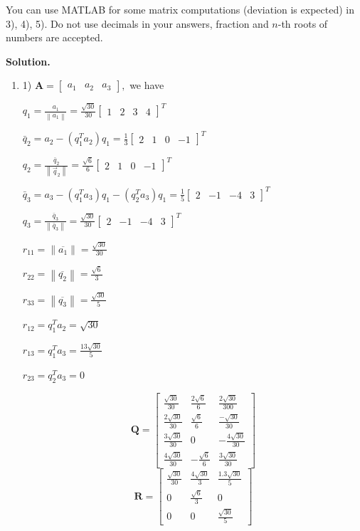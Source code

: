 \documentclass[english,onecolumn]{IEEEtran}
\begin{document}
 You can use MATLAB for some matrix computations (deviation is expected) in 3), 4), 5).
Do not use decimals in your answers, fraction and $n$-th roots of numbers are accepted.

\noindent
\textbf{Solution.}
\begin{enumerate}
	\item 1)  $\mathbf{A}=\left[\begin{array}{lll}a_{1} & a_{2} & a_{3}\end{array}\right],$ we have
	
	$q_{1}=\frac{a_{1}}{\left\|a_{1}\right\|}=\frac{\sqrt{30}}{30}
	\left[\begin{array}{llll}
		1 & 2 & 3 & 4
	\end{array}\right]^{T}$

$
\bar{q}_{2}=a_{2}-\left(q_{1}^{T} a_{2}\right) q_{1}=\frac{1}{3}
\left[\begin{array}{cccc}
	2 & 1 & 0 & -1
\end{array}\right]^{T} $

$ q_{2}=\frac{\bar{q}_{2}}{\left\|\vec{q}_{2}\right\|}=\frac{\sqrt{6}}{6}
\left[\begin{array}{cccc}
	2 & 1 & 0 & -1
\end{array}\right]^{T}
$

$\bar{q}_{3}=a_{3}-\left(q_{1}^{T} a_{3}\right) q_{1}-\left(q_{2}^{T} a_{3}\right) q_{1}=\frac{1}{5}\left[\begin{array}{cccc}2 & -1 & -4 & 3\end{array}\right]^{T} $

$ q_{3}=\frac{\bar{q}_{3}}{\left\|\bar{q}_{3}\right\|}=\frac{\sqrt{30}}{30}\left[\begin{array}{cccc}2 & -1 & -4 & 3\end{array}\right]^{T}$

$r_{11}=\left\|\overline{a_{1}}\right\|=\frac{\sqrt{30}}{30}$

$ r_{22}=\left\|\overline{q_{2}}\right\|=\frac{\sqrt{6}}{3} $

$r_{33}=\left\|\overline{q_{3}}\right\|=\frac{\sqrt{30}}{5}$

$r_{12}=q_{1}^{T} a_{2}=\sqrt{30} $

$ r_{13}=q_{1}^{T} a_{3}=\frac{13 \sqrt{30}}{5}$

$ r_{23}=q_{2}^{T} a_{3}=0$

$$
\mathbf{Q}=\left[\begin{array}{ccc}
	\frac{\sqrt{30}}{30} & \frac{2 \sqrt{6}}{6} & \frac{2 \sqrt{30}}{300} \\
	\frac{2 \sqrt{30}}{30} & \frac{\sqrt{6}}{6} & \frac{-\sqrt{30}}{30} \\
	\frac{3 \sqrt{30}}{30} & 0 & -\frac{4 \sqrt{30}}{30} \\
	\frac{4 \sqrt{30}}{30} & -\frac{\sqrt{6}}{6} & \frac{3 \sqrt{30}}{30}
\end{array}\right]
$$
$$
\mathbf{R}=\left[\begin{array}{ccc}
	\frac{\sqrt{30}}{30} & \frac{4\sqrt{30}}{3} & \frac{1.3 \sqrt{30}}{5} \\
	0 & \frac{\sqrt{6}}{3} & 0 \\
	0 & 0 & \frac{\sqrt{30}}{5}
\end{array}\right]
$$


\end{enumerate}
\end{document}
